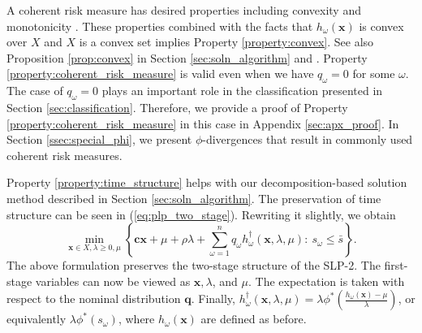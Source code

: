 \documentclass[opre,nonblindrev]{informs3} %
\newcommand{\x}{\mathbf{x}}
\renewcommand{\c}{\mathbf{c}}
\newcommand{\q}{\mathbf{q}}
\begin{document}
A coherent risk measure has desired properties including convexity and monotonicity \citep{rockafellar2007coherent,shaDR:09}.  
These properties combined with the facts that $h_\omega(\x)$ is convex over $X$ and $X$ is a convex set implies Property \ref{property:convex}.  
See also Proposition \ref{prop:convex} in Section \ref{sec:soln_algorithm} and \cite{bental2011robust}. 
Property \ref{property:coherent_risk_measure} is valid even when we have $q_\omega=0$ for some $\omega$.
The case of $q_\omega = 0$ plays an important role in the classification presented in Section \ref{sec:classification}. 
Therefore, we provide a proof of Property \ref{property:coherent_risk_measure} in this case in Appendix \ref{sec:apx_proof}. 
In Section \ref{ssec:special_phi}, we present $\phi$-divergences that result in commonly used coherent risk measures. 


Property \ref{property:time_structure} helps with our decomposition-based solution method described in Section \ref{sec:soln_algorithm}. 
The preservation of time structure can be seen in (\ref{eq:plp_two_stage}).  
Rewriting it slightly, we obtain
\begin{equation}
\label{eq:dec}
\min_{\x \in X,\lambda \geq 0,\mu} \left\{ \c\x + \mu + \rho \lambda +  \sum_{\omega=1}^{n} q_\omega h_\omega^{\dagger}(\x, \lambda, \mu) \colon \ s_\omega \leq \bar{s} \right\}.
\end{equation}
The above formulation preserves the two-stage structure of the SLP-2.
The first-stage variables can now be viewed as $\x, \lambda$, and $\mu$. 
The expectation is taken with respect to the nominal distribution $\q$. 
Finally, $ h^{\dagger}_\omega(\x, \lambda, \mu) =  \lambda \phi^*\left(\frac{h_\omega(\x) - \mu}{\lambda} \right)$, or equivalently $\lambda\phi^*(s_\omega)$, where $h_\omega(\x)$ are defined as before. 
\end{document}
